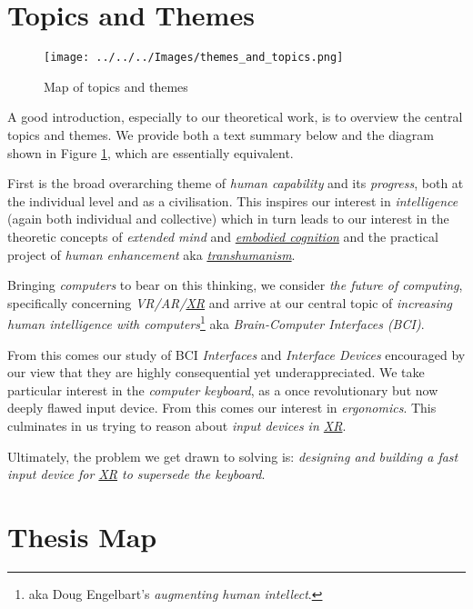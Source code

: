 \documentclass[logo,bsc,singlespacing,parskip]{infthesis}
\begin{document}
\chapter*{Topics and Themes}
\label{sec:orgbdd934f}
\begin{figure}[h]
\centering
\texttt{[image: ../../../Images/themes\_and\_topics.png]}
\caption{\label{fig:topics_themes}Map of topics and themes}
\end{figure}

A good introduction, especially to our theoretical work, is to overview the central topics and themes.
We provide both a text summary below and the diagram shown in Figure \ref{fig:topics_themes}, which are essentially equivalent.

First is the broad overarching theme of \emph{human capability} and its \emph{progress}, both at the individual level and as a civilisation.
This inspires our interest in \emph{intelligence} (again both individual and collective) which in turn leads to our interest in
the theoretic concepts of \emph{extended mind} and \emph{\hyperref[orgef09c3f]{embodied cognition}} and the practical project of \emph{human enhancement} aka \emph{\hyperref[orgdc9cd5b]{transhumanism}}.

Bringing \emph{computers} to bear on this thinking, we consider \emph{the future of computing}, specifically concerning \emph{VR/AR/\hyperref[org39cbd51]{XR}} and arrive at our central topic of \emph{increasing human intelligence with computers}\footnote{aka Doug Engelbart's \emph{augmenting human intellect}.} aka \emph{Brain-Computer Interfaces (BCI)}.

From this comes our study of BCI \emph{Interfaces} and \emph{Interface Devices} encouraged by our view that they are highly consequential yet underappreciated.
We take particular interest in the \emph{computer keyboard}, as a once revolutionary but now deeply flawed input device.
From this comes our interest in \emph{ergonomics}.
This culminates in us trying to reason about \emph{input devices in \hyperref[org39cbd51]{XR}}.

Ultimately, the problem we get drawn to solving is: \emph{designing and building a fast input device for \hyperref[org39cbd51]{XR} to supersede the keyboard}.
\chapter*{Thesis Map}
\label{sec:orgf84bca5}
\end{document}
